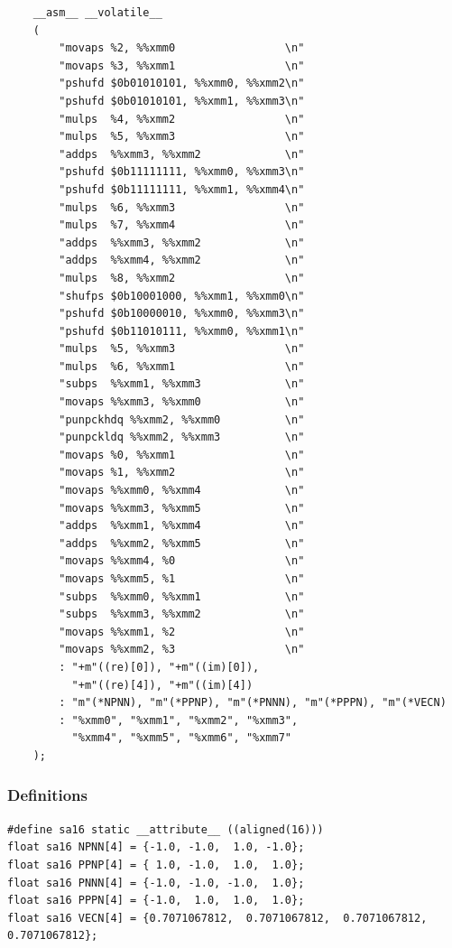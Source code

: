\documentclass[a4paper]{report}
\begin{document}
    \lstset{language = c, tabsize = 4}
    \begin{lstlisting}
    __asm__ __volatile__
    (
        "movaps %2, %%xmm0                 \n"
        "movaps %3, %%xmm1                 \n"
        "pshufd $0b01010101, %%xmm0, %%xmm2\n"
        "pshufd $0b01010101, %%xmm1, %%xmm3\n"
        "mulps  %4, %%xmm2                 \n"
        "mulps  %5, %%xmm3                 \n"
        "addps  %%xmm3, %%xmm2             \n"
        "pshufd $0b11111111, %%xmm0, %%xmm3\n"
        "pshufd $0b11111111, %%xmm1, %%xmm4\n"
        "mulps  %6, %%xmm3                 \n"
        "mulps  %7, %%xmm4                 \n"
        "addps  %%xmm3, %%xmm2             \n"
        "addps  %%xmm4, %%xmm2             \n"
        "mulps  %8, %%xmm2                 \n"
        "shufps $0b10001000, %%xmm1, %%xmm0\n"
        "pshufd $0b10000010, %%xmm0, %%xmm3\n"
        "pshufd $0b11010111, %%xmm0, %%xmm1\n"
        "mulps  %5, %%xmm3                 \n"
        "mulps  %6, %%xmm1                 \n"
        "subps  %%xmm1, %%xmm3             \n"
        "movaps %%xmm3, %%xmm0             \n"
        "punpckhdq %%xmm2, %%xmm0          \n"
        "punpckldq %%xmm2, %%xmm3          \n"
        "movaps %0, %%xmm1                 \n"
        "movaps %1, %%xmm2                 \n"
        "movaps %%xmm0, %%xmm4             \n"
        "movaps %%xmm3, %%xmm5             \n"
        "addps  %%xmm1, %%xmm4             \n"
        "addps  %%xmm2, %%xmm5             \n"
        "movaps %%xmm4, %0                 \n"
        "movaps %%xmm5, %1                 \n"
        "subps  %%xmm0, %%xmm1             \n"
        "subps  %%xmm3, %%xmm2             \n"
        "movaps %%xmm1, %2                 \n"
        "movaps %%xmm2, %3                 \n"
        : "+m"((re)[0]), "+m"((im)[0]),
          "+m"((re)[4]), "+m"((im)[4])
        : "m"(*NPNN), "m"(*PPNP), "m"(*PNNN), "m"(*PPPN), "m"(*VECN)
        : "%xmm0", "%xmm1", "%xmm2", "%xmm3",
          "%xmm4", "%xmm5", "%xmm6", "%xmm7" 
    );
    \end{lstlisting}

\subsubsection{Definitions} \indent

    \lstset{language = c, tabsize = 4}
    \begin{lstlisting}
#define sa16 static __attribute__ ((aligned(16)))
float sa16 NPNN[4] = {-1.0, -1.0,  1.0, -1.0};
float sa16 PPNP[4] = { 1.0, -1.0,  1.0,  1.0};
float sa16 PNNN[4] = {-1.0, -1.0, -1.0,  1.0};
float sa16 PPPN[4] = {-1.0,  1.0,  1.0,  1.0};
float sa16 VECN[4] = {0.7071067812,  0.7071067812,  0.7071067812,  0.7071067812};
    \end{lstlisting}
\end{document}
